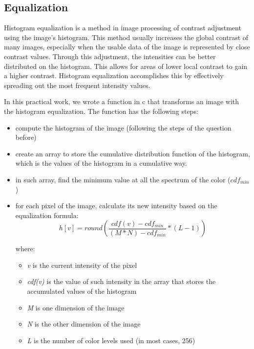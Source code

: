 \documentclass{article}
\begin{document}
	\subsection{Equalization}

	Histogram equalization is a method in image processing of contrast adjustment using the image's histogram. This method usually increases the global contrast 		of many images, especially when the usable data of the image is represented by close contrast values. Through this adjustment, the intensities can be better 		distributed on the histogram. This allows for areas of lower local contrast to gain a higher contrast. Histogram equalization accomplishes this by 		effectively spreading out the most frequent intensity values.

	In this practical work, we wrote a function in c that transforms an image with the histogram equalization. The function has the following steps:
	\begin{itemize}
  		\item compute the histogram of the image (following the steps of the question before)
  		\item create an array to store the cumulative distribution function of the histogram, which is the values of the histogram in a cumulative way.
  		\item in such array, find the minimum value at all the spectrum of the color ($cdf_{min}$)
  		\item for each pixel of the image, calculate its new intensity based on the equalization formula:
			\begin{equation}
				h[v]= round \left( \frac{cdf(v)-cdf_{min}}{(M * N) - cdf_{min}} * (L-1) \right) 
			\label{eq:equalization}
			\end{equation}
			
			where:		
			\begin{itemize}
	  			\item {\it v} is the current intensity of the pixel		
		  		\item {\it cdf(v)} is the value of such intensity in the array that stores the accumulated values of the histogram
		  		\item {\it M} is one dimension of the image		
		  		\item {\it N} is the other dimension of the image
		  		\item {\it L} is the number of color levels used (in most cases, 256)
			\end{itemize}
	\end{itemize}
\end{document}
